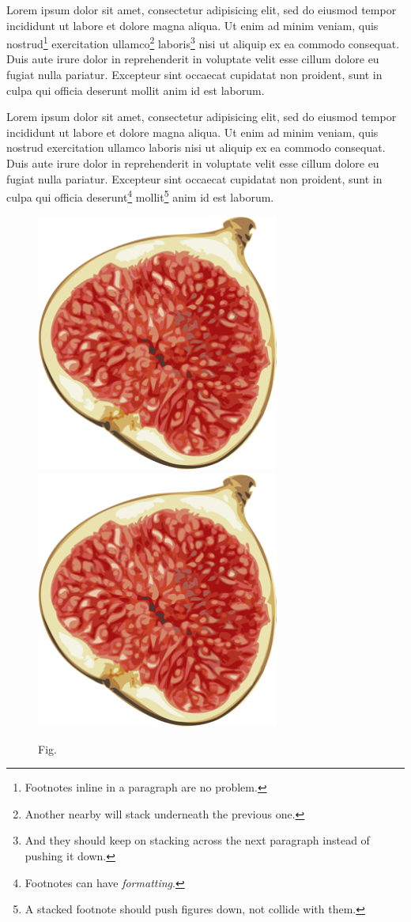 \documentclass{article}
\begin{document}
  Lorem ipsum dolor sit amet, consectetur adipisicing elit, sed do eiusmod tempor incididunt ut labore et dolore magna aliqua. Ut enim ad minim veniam, quis nostrud\footnote{Footnotes inline in a paragraph are no problem.} exercitation ullamco\footnote{Another nearby will stack underneath the previous one.} laboris\footnote{And they should keep on stacking across the next paragraph instead of pushing it down.} nisi ut aliquip ex ea commodo consequat. Duis aute irure dolor in reprehenderit in voluptate velit esse cillum dolore eu fugiat nulla pariatur. Excepteur sint occaecat cupidatat non proident, sunt in culpa qui officia deserunt mollit anim id est laborum.

  Lorem ipsum dolor sit amet, consectetur adipisicing elit, sed do eiusmod tempor incididunt ut labore et dolore magna aliqua. Ut enim ad minim veniam, quis nostrud exercitation ullamco laboris nisi ut aliquip ex ea commodo consequat. Duis aute irure dolor in reprehenderit in voluptate velit esse cillum dolore eu fugiat nulla pariatur. Excepteur sint occaecat cupidatat non proident, sunt in culpa qui officia deserunt\footnote{Footnotes can have \emph{formatting}.} mollit\footnote{A stacked footnote should push figures down, not collide with them.} anim id est laborum.

  \begin{figure}[h]
    \includegraphics[width=8cm]{fig.png}
    \includegraphics[width=8cm]{fig.png}
    \caption{Fig.}
    \label{fig:fig}
  \end{figure}
\end{document}
